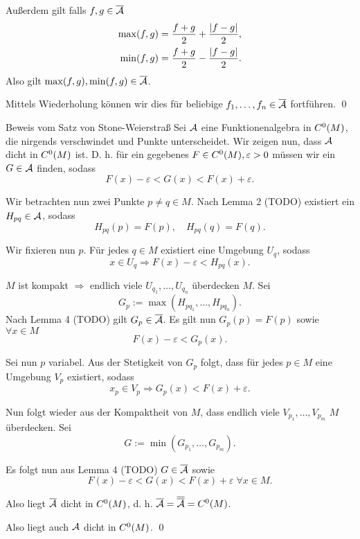 \begin{frame}
    Außerdem gilt falls \(f,g \in \overline{\mathcal{A}} \)
    \pause
    \begin{align*}
        \max(f,g) &= \frac{f+g}{2} + \frac{\left|f-g\right|}{2}, \\
        \min(f,g) &= \frac{f+g}{2} - \frac{\left|f-g\right|}{2}.
    \end{align*} 
    \pause
    Also gilt \( \max(f,g), \min(f,g) \in \overline{\mathcal{A}} \). 
    \pause

    Mittels Wiederholung können wir dies für beliebige 
    \( f_1, \ldots, f_n \in \overline{\mathcal{A}} \) fortführen.
    \qed
\end{frame}

\begin{frame}{Beweis vom Satz von Stone-Weierstraß}
    Sei \( \mathcal{A} \) eine Funktionenalgebra in \(C^0(M)\), die nirgends verschwindet und 
    Punkte unterscheidet. \pause
    Wir zeigen nun, dass \( \mathcal{A} \) dicht in \(C^0(M)\) ist. \pause
    D. h. für ein gegebenes \( F \in C^0(M), \varepsilon > 0 \) 
    müssen wir ein \( G \in \mathcal{A} \) finden, sodass 
    \[ F(x) - \varepsilon < G(x) < F(x) + \varepsilon. \]
    \pause

    Wir betrachten nun zwei Punkte \(p\neq q \in M\).
    Nach Lemma 2 (TODO) existiert ein \(H_{pq} \in \mathcal{A}\), 
    sodass 
    \[ H_{pq}(p) = F(p), \quad H_{pq}(q) = F(q). \]

    Wir fixieren nun \(p\). \pause
    Für jedes \(q \in M\) existiert eine Umgebung 
    \( U_q \), sodass 
    \[ x \in U_q \Rightarrow F(x) - \varepsilon < H_{pq}(x). \] 
\end{frame}


\begin{frame}
    \( M \) ist kompakt \( \Rightarrow \) endlich viele 
    \( U_{q_1}, \ldots, U_{q_n} \) überdecken \(M\). \pause
    Sei 
    \[ G_p := \max(H_{pq_1}, \ldots, H_{pq_n}). \]
    \pause
    Nach Lemma 4 (TODO) gilt \( G_p \in \overline{\mathcal{A}} \).
    Es gilt nun \(G_p(p) = F(p)\) sowie \( \forall x \in M \)
    \[ F(x) - \varepsilon < G_p(x). \]

    Sei nun \(p\) variabel. \pause
    Aus der Stetigkeit von \(G_p\) folgt, dass für jedes \(p \in M\) 
    eine Umgebung \(V_p\) existiert, sodass 
    \[ x_p \in V_p \Rightarrow G_p(x) < F(x) + \varepsilon. \]
    \pause
\end{frame}

\begin{frame}
    Nun folgt wieder aus der Kompaktheit von \(M\), dass 
    endlich viele \( V_{p_1}, \ldots, V_{p_m} \) \(M\) überdecken.
    \pause
    Sei 
    \[ G := \min(G_{p_1}, \ldots, G_{p_m}). \]

    Es folgt nun aus Lemma 4 (TODO)
    \( G \in \overline{\mathcal{A}} \) sowie 
    \[ F(x) - \varepsilon < G(x) < F(x) + \varepsilon \;\forall x \in M. \]
    \pause

    Also liegt \( \overline{\mathcal{A}} \) dicht in \( C^0(M) \)\pause, d. h. \( \overline{\mathcal{A}} = \overline{\overline{\mathcal{A}}} = C^0(M) \).
    \pause

    Also liegt auch \( \mathcal{A} \) dicht in \(C^0(M)\).
    \qed
\end{frame}